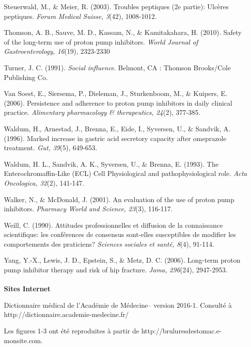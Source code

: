 \begin{thebibliography}{9}
  Steuerwald, M., \& Meier, R. (2003). Troubles peptiques (2e partie): Ulcères peptiques. \textit{Forum Medical Suisse, 3}(42), 1008-1012. 
  
  Thomson, A. B., Sauve, M. D., Kassam, N., \& Kamitakahara, H. (2010). Safety of the long-term use of proton pump inhibitors. \textit{World Journal of Gastroenterology, 16}(19), 2323-2330
  
  Turner, J. C. (1991). \textit{Social influence}. Belmont, CA : Thomson Brooks/Cole Publishing Co.
  
  Van Soest, E., Siersema, P., Dieleman, J., Sturkenboom, M., \& Kuipers, E. (2006). Persistence and adherence to proton pump inhibitors in daily clinical practice. \textit{Alimentary pharmacology \& therapeutics, 24}(2), 377-385. 
  
  Waldum, H., Arnestad, J., Brenna, E., Eide, I., Syversen, U., \& Sandvik, A. (1996). Marked increase in gastric acid secretory capacity after omeprazole treatment. \textit{Gut, 39}(5), 649-653. 
  
  Waldum, H. L., Sandvik, A. K., Syversen, U., \& Brenna, E. (1993). The Enterochromaffin-Like (ECL) Cell Physiological and pathophysiological role. \textit{Acta Oncologica, 32}(2), 141-147. 
  
  Walker, N., \& McDonald, J. (2001). An evaluation of the use of proton pump inhibitors. \textit{Pharmacy World and Science, 23}(3), 116-117.
  
 Weill, C. (1990). Attitudes professionnelles et diffusion de la connaissance scientifique: les conférences de consensus sont-elles susceptibles de modifier les comportements des praticiens? \textit{Sciences sociales et santé, 8}(4), 91-114.  
  
 Yang, Y.-X., Lewis, J. D., Epstein, S., \& Metz, D. C. (2006). Long-term proton pump inhibitor therapy and risk of hip fracture. \textit{Jama, 296}(24), 2947-2953. \\
\vspace*{1cm} \\
{\huge{\textbf{Sites Internet}}}


    Dictionnaire médical de l'Académie de Médecine– version 2016-1. Consulté à http://dictionnaire.academie-medecine.fr/
    
    Les figures 1-3 ont été reproduites à partir de http://bruluresdestomac.e-monsite.com. 
    

\end{thebibliography}
